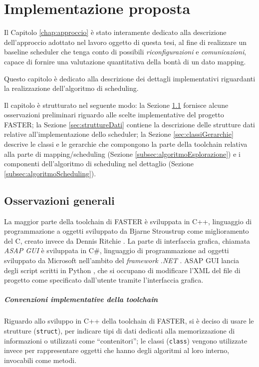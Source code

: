 \chapter{Implementazione proposta}
\label{chap:implementazione}
\vspace{1cm}
Il Capitolo \ref{chap:approccio} è stato interamente dedicato alla descrizione 
dell'approccio adottato nel lavoro oggetto di questa tesi, al fine di 
realizzare un baseline scheduler che tenga conto di possibili 
\emph{riconfigurazioni} e \emph{comunicazioni}, capace di fornire una 
valutazione quantitativa della bontà di un dato mapping.

Questo capitolo è dedicato alla descrizione dei dettagli implementativi 
riguardanti la realizzazione dell'algoritmo di scheduling.

Il capitolo è strutturato nel seguente modo: la Sezione 
\ref{sec:osservazioniGenerali} fornisce alcune osservazioni preliminari 
riguardo alle scelte implementative del progetto \ac{FASTER}; la Sezione 
\ref{sec:struttureDati} contiene la descrizione delle strutture dati relative 
all'implementazione dello scheduler; la Sezione \ref{sec:classiGerarchie} 
descrive le classi e le gerarchie che compongono la parte della toolchain 
relativa alla parte di mapping/scheduling (Sezione 
\ref{subsec:algoritmoEsplorazione}) e i componenti dell'algoritmo di scheduling 
nel dettaglio (Sezione \ref{subsec:algoritmoScheduling}).


\section{Osservazioni generali}
\label{sec:osservazioniGenerali}
La maggior parte della toolchain di \ac{FASTER} è sviluppata in C++, 
linguaggio di programmazione a oggetti sviluppato da Bjarne Stroustrup 
\cite{CppStroustrup} come miglioramento del C, creato invece da Dennis Ritchie 
\cite{CKernighanRitchie}. La parte di interfaccia grafica, chiamata \emph{ASAP 
GUI} è sviluppata in C\#, linguaggio di programmazione ad oggetti sviluppato da 
Microsoft nell'ambito del \emph{framework .NET} \cite{ProCSharp}. ASAP GUI 
lancia degli script scritti in Python \cite{ThinkPython}, che si occupano di 
modificare l'XML del file di progetto come specificato dall'utente tramite 
l'interfaccia grafica.
\paragraph{Convenzioni implementative della toolchain}
Riguardo allo sviluppo in C++ della toolchain di \ac{FASTER}, si è deciso di 
usare le strutture (\verb+struct+), per indicare tipi di dati dedicati alla 
memorizzazione di informazioni o utilizzati come ``contenitori''; le classi 
(\verb+class+) vengono utilizzate invece per rappresentare oggetti che hanno 
degli algoritmi al loro interno, invocabili come metodi.


